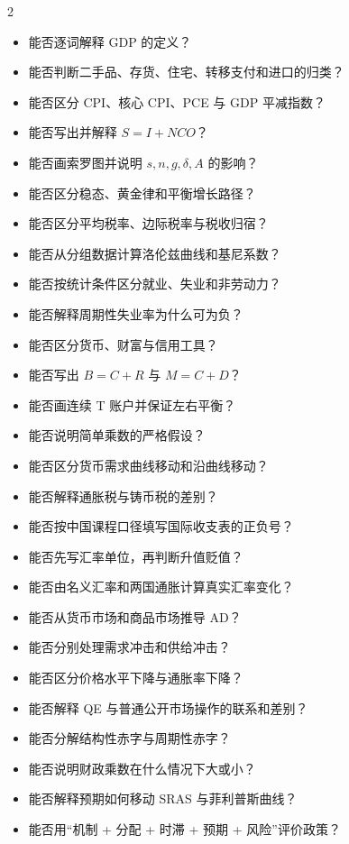 \documentclass[UTF8,11pt,a4paper]{ctexart}
\begin{document}
\begin{multicols}{2}
\begin{itemize}
  \item 能否逐词解释 GDP 的定义？
  \item 能否判断二手品、存货、住宅、转移支付和进口的归类？
  \item 能否区分 CPI、核心 CPI、PCE 与 GDP 平减指数？
  \item 能否写出并解释 $S=I+NCO$？
  \item 能否画索罗图并说明 $s,n,g,\delta,A$ 的影响？
  \item 能否区分稳态、黄金律和平衡增长路径？
  \item 能否区分平均税率、边际税率与税收归宿？
  \item 能否从分组数据计算洛伦兹曲线和基尼系数？
  \item 能否按统计条件区分就业、失业和非劳动力？
  \item 能否解释周期性失业率为什么可为负？
  \item 能否区分货币、财富与信用工具？
  \item 能否写出 $B=C+R$ 与 $M=C+D$？
  \item 能否画连续 T 账户并保证左右平衡？
  \item 能否说明简单乘数的严格假设？
  \item 能否区分货币需求曲线移动和沿曲线移动？
  \item 能否解释通胀税与铸币税的差别？
  \item 能否按中国课程口径填写国际收支表的正负号？
  \item 能否先写汇率单位，再判断升值贬值？
  \item 能否由名义汇率和两国通胀计算真实汇率变化？
  \item 能否从货币市场和商品市场推导 AD？
  \item 能否分别处理需求冲击和供给冲击？
  \item 能否区分价格水平下降与通胀率下降？
  \item 能否解释 QE 与普通公开市场操作的联系和差别？
  \item 能否分解结构性赤字与周期性赤字？
  \item 能否说明财政乘数在什么情况下大或小？
  \item 能否解释预期如何移动 SRAS 与菲利普斯曲线？
  \item 能否用“机制 + 分配 + 时滞 + 预期 + 风险”评价政策？
\end{itemize}
\end{multicols}
\end{document}
